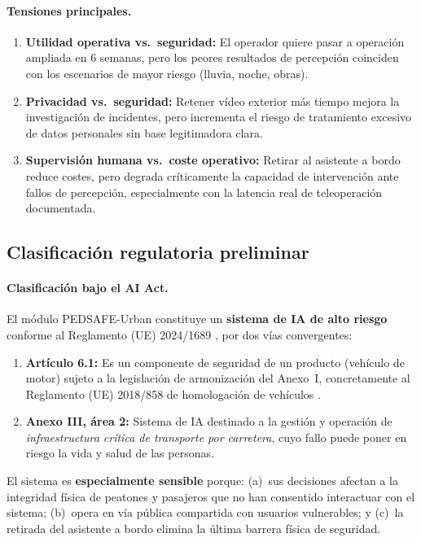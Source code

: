 \documentclass[11pt]{article}
\begin{document}
\paragraph{Tensiones principales.}
\begin{enumerate}[nosep]
    \item \textbf{Utilidad operativa vs.\ seguridad:} El operador quiere pasar a operación ampliada en 6 semanas, pero los peores resultados de percepción coinciden con los escenarios de mayor riesgo (lluvia, noche, obras).
    \item \textbf{Privacidad vs.\ seguridad:} Retener vídeo exterior más tiempo mejora la investigación de incidentes, pero incrementa el riesgo de tratamiento excesivo de datos personales sin base legitimadora clara.
    \item \textbf{Supervisión humana vs.\ coste operativo:} Retirar al asistente a bordo reduce costes, pero degrada críticamente la capacidad de intervención ante fallos de percepción, especialmente con la latencia real de teleoperación documentada.
\end{enumerate}

\subsection{Clasificación regulatoria preliminar}

\paragraph{Clasificación bajo el AI Act.} El módulo PEDSAFE-Urban constituye un \textbf{sistema de IA de alto riesgo} conforme al Reglamento (UE) 2024/1689 \parencite{eu2024aiact}, por dos vías convergentes:
\begin{enumerate}[nosep]
    \item \textbf{Artículo 6.1:} Es un componente de seguridad de un producto (vehículo de motor) sujeto a la legislación de armonización del Anexo~I, concretamente al Reglamento (UE) 2018/858 de homologación de vehículos \parencite{eu2018motor}.
    \item \textbf{Anexo III, área 2:} Sistema de IA destinado a la gestión y operación de \textit{infraestructura crítica de transporte por carretera}, cuyo fallo puede poner en riesgo la vida y salud de las personas.
\end{enumerate}

El sistema es \textbf{especialmente sensible} porque: (a)~sus decisiones afectan a la integridad física de peatones y pasajeros que no han consentido interactuar con el sistema; (b)~opera en vía pública compartida con usuarios vulnerables; y (c)~la retirada del asistente a bordo elimina la última barrera física de seguridad.
\end{document}
